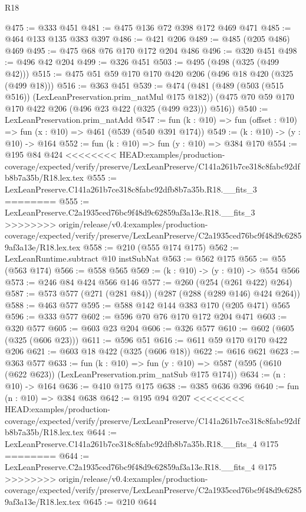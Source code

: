 \begin{lexlean}{R18}
\begin{coremodule}
{{{{{{{{{{{{{@475 := @333 @451
@481 := @475 @136 @72 @398 @172 @469 @471
@485 := @464 @133 @135 @383 @397
@486 := @421 @206
@489 := @485 (@205 @486) @469
@495 := @475 @68 @76 @170 @172 @204 @486
@496 := @320 @451
@498 := @496 @42 @204
@499 := @326 @451
@503 := @495 (@498 (@325 (@499 @42)))
@515 := @475 @51 @59 @170 @170 @420 @206 (@496 @18 @420 (@325 (@499 @18)))
@516 := @363 @451
@539 := @474
    (@481
      (@489 (@503 (@515 @516)) (LexLeanPreservation.prim_natMul @175 @182))
      (@475 @70 @59 @170 @170 @422 @206 (@496 @23 @422 (@325 (@499 @23))) @516))
@540 := LexLeanPreservation.prim_natAdd
@547 := fun (k : @10) => fun (offset : @10) => fun (x : @10) => @461 (@539 (@540 @391 @174))
@549 := (k : @10) -> (y : @10) -> @164
@552 := fun (k : @10) => fun (y : @10) => @384 @170
@554 := @195 @84 @424
<<<<<<<< HEAD:examples/production-coverage/expected/verify/preserve/LexLeanPreserve/C141a261b7ce318c8fabc92dfb8b7a35b/R18.lex.tex
@555 := LexLeanPreserve.C141a261b7ce318c8fabc92dfb8b7a35b.R18.__fits_3
========
@555 := LexLeanPreserve.C2a1935ced76bc9f48d9c62859af3a13e.R18.__fits_3
>>>>>>>> origin/release/v0.4:examples/production-coverage/expected/verify/preserve/LexLeanPreserve/C2a1935ced76bc9f48d9c62859af3a13e/R18.lex.tex
@558 := @210 (@555 @174 @175)
@562 := LexLeanRuntime.subtract @10 instSubNat
@563 := @562 @175
@565 := @55 (@563 @174)
@566 := @558 @565
@569 := (k : @10) -> (y : @10) -> @554 @566
@573 := @246 @84 @424 @566 @146
@577 := @260 (@254 (@261 @422) @264)
@587 := @573 @577 (@271 (@281 @84)) (@287 (@288 (@289 @146) @424 @264))
@588 := @463 @577
@595 := @588 @142 @144 @383 @170 (@205 @471) @565
@596 := @333 @577
@602 := @596 @70 @76 @170 @172 @204 @471
@603 := @320 @577
@605 := @603 @23 @204
@606 := @326 @577
@610 := @602 (@605 (@325 (@606 @23)))
@611 := @596 @51
@616 := @611 @59 @170 @170 @422 @206
@621 := @603 @18 @422 (@325 (@606 @18))
@622 := @616 @621
@623 := @363 @577
@633 := fun (k : @10) =>
  fun (y : @10) => @587 (@595 (@610 (@622 @623)) (LexLeanPreservation.prim_natSub @175 @174))
@634 := (n : @10) -> @164
@636 := @410 @175 @175
@638 := @385 @636 @396
@640 := fun (n : @10) => @384 @638
@642 := @195 @94 @207
<<<<<<<< HEAD:examples/production-coverage/expected/verify/preserve/LexLeanPreserve/C141a261b7ce318c8fabc92dfb8b7a35b/R18.lex.tex
@644 := LexLeanPreserve.C141a261b7ce318c8fabc92dfb8b7a35b.R18.__fits_4 @175
========
@644 := LexLeanPreserve.C2a1935ced76bc9f48d9c62859af3a13e.R18.__fits_4 @175
>>>>>>>> origin/release/v0.4:examples/production-coverage/expected/verify/preserve/LexLeanPreserve/C2a1935ced76bc9f48d9c62859af3a13e/R18.lex.tex
@645 := @210 @644
}}}}}}}}}}}}}
\end{coremodule}
\end{lexlean}
